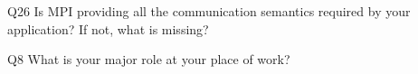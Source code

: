 \begin{description}%
\item{Q26} Is MPI providing all the communication semantics required by your application? If not, what is missing?%
\item{Q8} What is your major role at your place of work?%
\end{description}%

